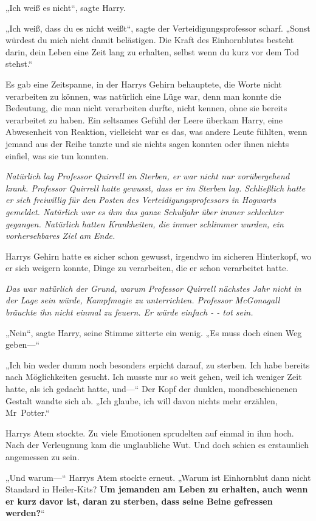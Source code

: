 {„Ich weiß es nicht“, sagte Harry.

„Ich weiß, dass du es nicht weißt“, sagte der Verteidigungsprofessor scharf. „Sonst würdest du mich nicht damit belästigen. Die Kraft des Einhornblutes besteht darin, dein Leben eine Zeit lang zu erhalten, selbst wenn du kurz vor dem Tod stehst.“

Es gab eine Zeitspanne, in der Harrys Gehirn behauptete, die Worte nicht verarbeiten zu können, was natürlich eine Lüge war, denn man konnte die Bedeutung, die man nicht verarbeiten durfte, nicht kennen, ohne sie bereits verarbeitet zu haben. Ein seltsames Gefühl der Leere überkam Harry, eine Abwesenheit von Reaktion, vielleicht war es das, was andere Leute fühlten, wenn jemand aus der Reihe tanzte und sie nichts sagen konnten oder ihnen nichts einfiel, was sie tun konnten.

\emph{Natürlich lag Professor Quirrell im Sterben, er war nicht nur vorübergehend krank. Professor Quirrell hatte gewusst, dass er im Sterben lag. Schließlich hatte er sich freiwillig für den Posten des Verteidigungsprofessors in Hogwarts gemeldet. Natürlich war es ihm das ganze Schuljahr über immer schlechter gegangen. Natürlich hatten Krankheiten, die immer schlimmer wurden, ein vorhersehbares Ziel am Ende.}

Harrys Gehirn hatte es sicher schon gewusst, irgendwo im sicheren Hinterkopf, wo er sich weigern konnte, Dinge zu verarbeiten, die er schon verarbeitet hatte.

\emph{Das war natürlich der Grund, warum Professor Quirrell nächstes Jahr nicht in der Lage sein würde, Kampfmagie zu unterrichten. Professor McGonagall bräuchte ihn nicht einmal zu feuern. Er würde einfach - - tot sein.}

„Nein“, sagte Harry, seine Stimme zitterte ein wenig. „Es muss doch einen Weg geben—“

„Ich bin weder dumm noch besonders erpicht darauf, zu sterben. Ich habe bereits nach Möglichkeiten gesucht. Ich musste nur so weit gehen, weil ich weniger Zeit hatte, als ich gedacht hatte, und—“ Der Kopf der dunklen, mondbeschienenen Gestalt wandte sich ab. „Ich glaube, ich will davon nichts mehr erzählen, Mr~Potter.“

Harrys Atem stockte. Zu viele Emotionen sprudelten auf einmal in ihm hoch. Nach der Verleugnung kam die unglaubliche Wut. Und doch schien es erstaunlich angemessen zu sein.

„Und warum—“ Harrys Atem stockte erneut. „Warum ist Einhornblut dann nicht Standard in Heiler-Kits? \textbf{Um jemanden am Leben zu erhalten, auch wenn er kurz davor ist, daran zu sterben, dass seine Beine gefressen werden?}“

}

